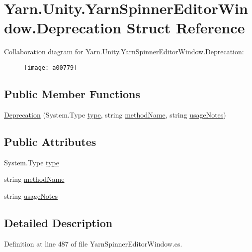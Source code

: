 \hypertarget{a00080}{\section{Yarn.\-Unity.\-Yarn\-Spinner\-Editor\-Window.\-Deprecation Struct Reference}
\label{a00080}
}


Collaboration diagram for Yarn.\-Unity.\-Yarn\-Spinner\-Editor\-Window.\-Deprecation\-:
\nopagebreak
\begin{figure}[H]
\begin{center}
\leavevmode
\texttt{[image: a00779]}
\end{center}
\end{figure}
\subsection*{Public Member Functions}
\begin{DoxyCompactItemize}
\item 
\hyperlink{a00080_ae80171841e97a48611c51a9a574a2fc0}{Deprecation} (System.\-Type \hyperlink{a00080_a750904df254223bf3131c39017f90a0b}{type}, string \hyperlink{a00080_a61605b2d0a17dfdf9c62952270d44fbd}{method\-Name}, string \hyperlink{a00080_ac23509be7ae6b43a3e2154dd430954a7}{usage\-Notes})
\end{DoxyCompactItemize}
\subsection*{Public Attributes}
\begin{DoxyCompactItemize}
\item 
System.\-Type \hyperlink{a00080_a750904df254223bf3131c39017f90a0b}{type}
\item 
string \hyperlink{a00080_a61605b2d0a17dfdf9c62952270d44fbd}{method\-Name}
\item 
string \hyperlink{a00080_ac23509be7ae6b43a3e2154dd430954a7}{usage\-Notes}
\end{DoxyCompactItemize}


\subsection{Detailed Description}


Definition at line 487 of file Yarn\-Spinner\-Editor\-Window.\-cs.



